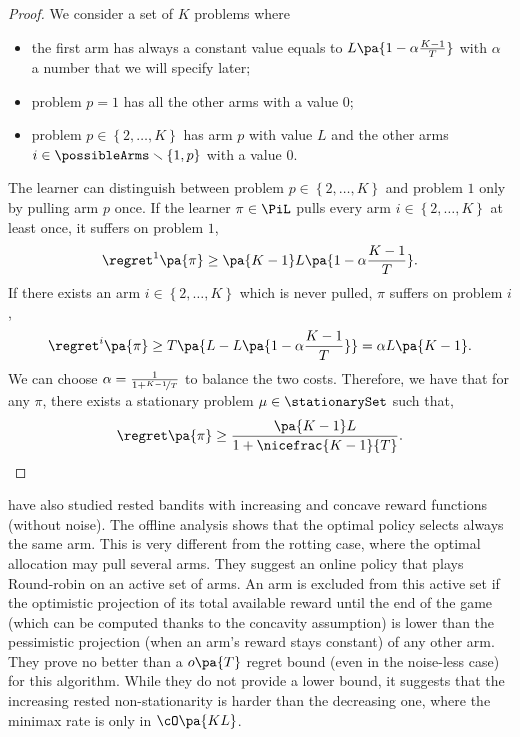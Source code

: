 \begin{proof}
We consider a set of $K$ problems where 
\begin{itemize}
\item the first arm has always a constant value equals to $L\pa{1- \alpha\frac{K-1}{T}}$ with $\alpha$ a number that we will specify later;
\item problem $p =1$ has all the other arms with a value $0$;
\item problem $p \in \left\lbrace 2, \dots, K \right\rbrace$ has arm $p$ with value $L$ and the other arms $i\in \possibleArms \smallsetminus \left\lbrace 1, p\right\rbrace$ with a value $0$.
\end{itemize}
The learner can distinguish between problem $p \in \left\lbrace 2, \dots, K \right\rbrace$ and problem $1$ only by pulling arm $p$ once. If the learner $\pi \in \PiL$ pulls every arm $i \in \left\lbrace 2, \dots, K \right\rbrace$ at least once, it suffers on problem $1$,
\[\regret^1\pa{\pi} \geq \pa{K-1}L\pa{1- \alpha\frac{K-1}{T}}.\]
If there exists an arm $i \in \left\lbrace 2, \dots, K \right\rbrace$ which is never pulled, $\pi$ suffers on problem $i$,
\[\regret^i\pa{\pi} \geq T \pa{L - L\pa{1- \alpha\frac{K-1}{T}}}= \alpha L\pa{K-1}.\]
We can choose $\alpha = \frac{1}{1+ \nicefrac{K-1}{T}}$ to balance the two costs. Therefore, we have that for any $\pi$, there exists a stationary problem $\mu \in \stationarySet$ such that,
\[\regret\pa{\pi} \geq \frac{\pa{K-1}L}{1+ \nicefrac{K-1}{T}}.\]
\end{proof} 
\begin{remark}
\citet{heidari2016tight} have also studied rested bandits with increasing and concave reward functions (without noise). The offline analysis shows that the optimal policy selects always the same arm. This is very different from the rotting case, where the optimal allocation may pull several arms. They suggest an online policy that plays Round-robin on an active set of arms. An arm is excluded from this active set if the optimistic projection of its total available reward until the end of the game (which can be computed thanks to the concavity assumption) is lower than the pessimistic projection (when an arm's reward stays constant) of any other arm. They prove no better than a $o\pa{T}$ regret bound (even in the noise-less case) for this algorithm. While they do not provide a lower bound, it suggests that the increasing rested non-stationarity is harder than the decreasing one, where the minimax rate is only in $\cO\pa{KL}$.
\end{remark}

